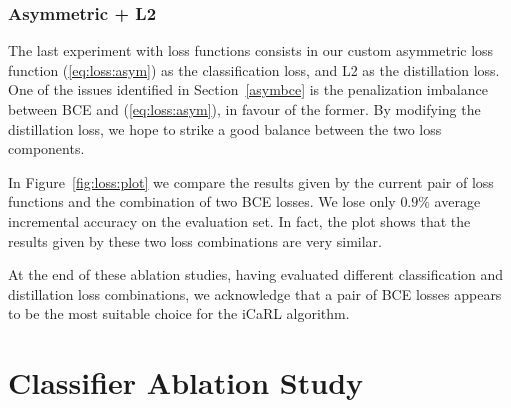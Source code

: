\documentclass[10pt,twocolumn,letterpaper]{article}
\begin{document}
\subsubsection{Asymmetric + L2}
The last experiment with loss functions consists in our custom asymmetric loss function (\ref{eq:loss:asym}) as the classification loss, and L2 as the distillation loss. One of the issues identified in Section~\ref{asymbce} is the penalization imbalance between BCE and (\ref{eq:loss:asym}), in favour of the former. By modifying the distillation loss, we hope to strike a good balance between the two loss components.

In Figure~\ref{fig:loss:plot} we compare the results given by the current pair of loss functions and the combination of two BCE losses. We lose only $0.9\%$ average incremental accuracy on the evaluation set. In fact, the plot shows that the results given by these two loss combinations are very similar.

At the end of these ablation studies, having evaluated different classification and distillation loss combinations, we acknowledge that a pair of BCE losses appears to be the most suitable choice for the iCaRL algorithm.

\section{Classifier Ablation Study}
\label{section:classifier}
\end{document}
